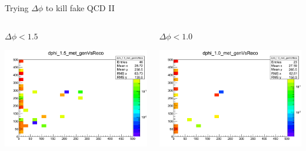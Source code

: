 \documentclass[8pt]{beamer}
\begin{document}
\begin{frame}{Trying $\Delta\phi$ to kill fake QCD II}

\begin{columns}

\begin{block}{$\Delta\phi<1.5$}
 
\centering
\includegraphics[width=\linewidth]{img/dphi_1p5_met_genVsReco.png} 
 
\end{block}

\begin{block}{$\Delta\phi<1.0$}
 
\centering
\includegraphics[width=\linewidth]{img/dphi_1p0_met_genVsReco.png} 
 
\end{block}



\end{columns}
\end{frame}
\end{document}
